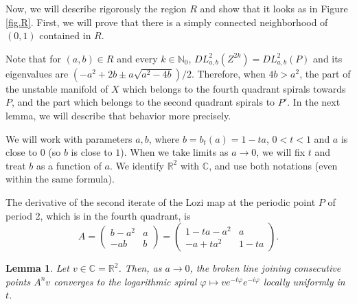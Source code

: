 \documentclass[12pt]{amsart}
\theoremstyle{plain}
\newtheorem{lem}[theorem]{Lemma}
\theoremstyle{definition}
\def\R{{\mathbb R}}
\def\N{{\mathbb N}}
\newcommand{\C}{\mathbb{C}}
\renewcommand{\phi}{\varphi}
\begin{document}
	Now, we will describe rigorously the region $R$ and show that it looks 
	as in Figure \ref{fig.R}. First, we will prove that there is 
	a simply connected neighborhood of $(0, 1)$ contained in $R$. 
	
	Note that for $(a,b) \in R$ and every $k \in \N_0$, 
	$DL^2_{a,b}(Z^{2k}) = DL^2_{a,b}(P)$ and its eigenvalues are 
	$(-a^2 + 2b \pm a\sqrt{a^2 - 4b})/2$. Therefore, when $4b > a^2$, 
	the part of the unstable manifold of $X$ which belongs to the 
	fourth quadrant spirals towards $P$, and the part which belongs to 
	the second quadrant spirals to $P'$. In the next lemma, we will 
	describe that behavior more precisely. 
	
	We will work with parameters $a,b$, where $b = b_t(a) = 1-ta$, $0<t<1$ 
	and $a$ is close to $0$ (so $b$ is close to $1$). When we take limits 
	as $a\to 0$, we will fix $t$ and treat $b$ as a function of $a$.
	We identify $\R^2$ with $\C$, and use both notations (even within the
	same formula).
	
	The derivative of the second iterate of the Lozi map at the periodic 
	point $P$ of period 2, which is in the fourth quadrant, is
	\[
	A =
	\begin{pmatrix}
		b-a^2 & a\\
		-ab & b
	\end{pmatrix}
	=
	\begin{pmatrix}
		1-ta-a^2 & a\\
		-a+ta^2 & 1-ta
	\end{pmatrix}.
	\]
	
	\begin{lem}\label{l1}
		Let $v\in\C=\R^2$. Then, as $a\to 0$, the broken line joining
		consecutive points $A^nv$ converges to the logarithmic spiral
		$\phi\mapsto ve^{-t\phi}e^{-i\phi}$ locally uniformly in $t$.
	\end{lem}
	
\end{document}

